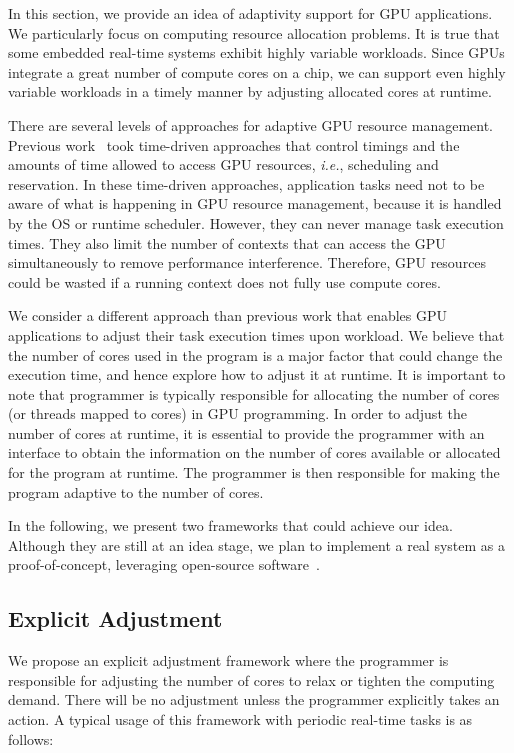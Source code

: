 \documentclass[times, 10pt, twocolumn]{article}
\begin{document}
In this section, we provide an idea of adaptivity support for GPU
applications.
We particularly focus on computing resource allocation problems.
It is true that some embedded real-time systems exhibit highly variable
workloads.
Since GPUs integrate a great number of compute cores on a chip, we can
support even highly variable workloads in a timely manner by adjusting
allocated cores at runtime.

There are several levels of approaches for adaptive GPU resource
management.
Previous work~\cite{Kato_RTAS11, Kato_RTSS11, Kato_ATC11} took
time-driven approaches that control timings and the amounts of time
allowed to access GPU resources, \textit{i.e.}, scheduling and
reservation.
In these time-driven approaches, application tasks need not to be aware
of what is happening in GPU resource management, because it is handled
by the OS or runtime scheduler.
However, they can never manage task execution times.
They also limit the number of contexts that can access the GPU
simultaneously to remove performance interference.
Therefore, GPU resources could be wasted if a running context does not
fully use compute cores.

We consider a different approach than previous work that enables GPU
applications to adjust their task execution times upon workload.
We believe that the number of cores used in the program is a major
factor that could change the execution time, and hence explore how to
adjust it at runtime.
It is important to note that programmer is typically responsible for
allocating the number of cores (or threads mapped to cores) in GPU
programming.
In order to adjust the number of cores at runtime, it is essential to
provide the programmer with an interface to obtain the information on
the number of cores available or allocated for the program at runtime.
The programmer is then responsible for making the program adaptive to
the number of cores.

In the following, we present two frameworks that could achieve our idea.
Although they are still at an idea stage, we plan to implement a real
system as a proof-of-concept, leveraging open-source
software~\cite{Kato_OSPERT11}.

\subsection{Explicit Adjustment}

We propose an explicit adjustment framework where the programmer is
responsible for adjusting the number of cores to relax or tighten
the computing demand.
There will be no adjustment unless the programmer explicitly takes an
action.
A typical usage of this framework with periodic real-time tasks is as
follows:
\end{document}
